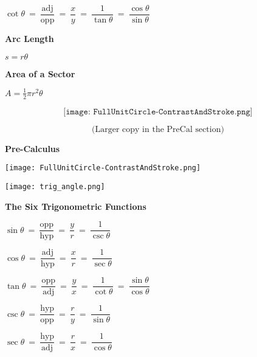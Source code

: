 \documentclass{article}
\begin{document}
\begin{large}
\begin{multicols}{2}
$\cot \theta\ =\ \dfrac{\text{adj}}{\text{opp}}\ =\ \dfrac{x}{y}\ =\ \dfrac{1}{\tan \theta}\ =\ \dfrac{\cos \theta}{\sin \theta}$

\columnbreak

\textbf{Arc Length} 

$s = r\theta$

\textbf{Area of a Sector} 

$A = \frac{1}{2} \pi r^2 \theta$

\end{multicols}


\[\texttt{[image: FullUnitCircle-ContrastAndStroke.png]}\]

\[\text{(Larger copy in the PreCal section)}\]

\newpage 

\chead{ }

\vspace*{\fill}

\begin{center}{\textbf{\Huge Pre-Calculus }}\end{center}

\vspace*{\fill}

\newpage


\hspace{-0.6in}\texttt{[image: FullUnitCircle-ContrastAndStroke.png]}

\newpage


\begin{multicols}{2}

\texttt{[image: trig\_angle.png]}

{
\textbf{The Six Trigonometric Functions}

$\sin \theta\ =\ \dfrac{\text{opp}}{\text{hyp}}\ =\ \dfrac{y}{r}\ =\ \dfrac{1}{\csc \theta}$

$\cos \theta\ =\ \dfrac{\text{adj}}{\text{hyp}}\ =\ \dfrac{x}{r}\ =\ \dfrac{1}{\sec \theta}$

$\tan \theta\ =\ \dfrac{\text{opp}}{\text{adj}}\ =\ \dfrac{y}{x}\ =\ \dfrac{1}{\cot \theta}\ =\ \dfrac{\sin \theta}{\cos \theta}$

$\csc \theta\ =\ \dfrac{\text{hyp}}{\text{opp}}\ =\ \dfrac{r}{y}\ =\ \dfrac{1}{\sin \theta}$

$\sec \theta\ =\ \dfrac{\text{hyp}}{\text{adj}}\ =\ \dfrac{r}{x}\ =\ \dfrac{1}{\cos \theta}$

}
\end{multicols}
\end{large}
\end{document}
